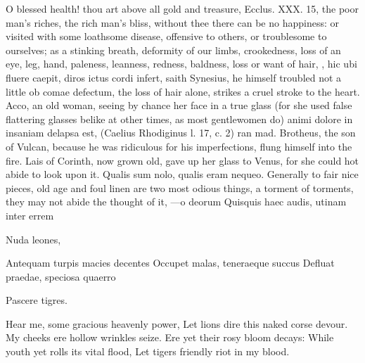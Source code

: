 {O blessed health! thou art above all gold and treasure, Ecclus. XXX.
15, the poor man's riches, the rich man's bliss, without thee there can
be no happiness: or visited with some loathsome disease, offensive to
others, or troublesome to ourselves; as a stinking breath, deformity of
our limbs, crookedness, loss of an eye, leg, hand, paleness, leanness,
redness, baldness, loss or want of hair, \etc{}, hic ubi fluere caepit,
diros ictus cordi infert, saith Synesius, he himself troubled not
a little ob comae defectum, the loss of hair alone, strikes a cruel
stroke to the heart. Acco, an old woman, seeing by chance her face in a
true glass (for she used false flattering glasses belike at other
times, as most gentlewomen do) animi dolore in insaniam delapsa est,
(Caelius Rhodiginus l. 17, c. 2) ran mad. Brotheus, the son of
Vulcan, because he was ridiculous for his imperfections, flung himself
into the fire. Lais of Corinth, now grown old, gave up her glass to
Venus, for she could hot abide to look upon it. Qualis sum nolo,
qualis eram nequeo. Generally to fair nice pieces, old age and foul
linen are two most odious things, a torment of torments, they may not
abide the thought of it,
---o deorum
Quisquis haec audis, utinam inter errem

Nuda leones,

Antequam turpis macies decentes
Occupet malas, teneraeque succus
Defluat praedae, speciosa quaerro

Pascere tigres.


Hear me, some gracious heavenly power,
Let lions dire this naked corse devour.
My cheeks ere hollow wrinkles seize.
Ere yet their rosy bloom decays:
While youth yet rolls its vital flood,
Let tigers friendly riot in my blood.

}
